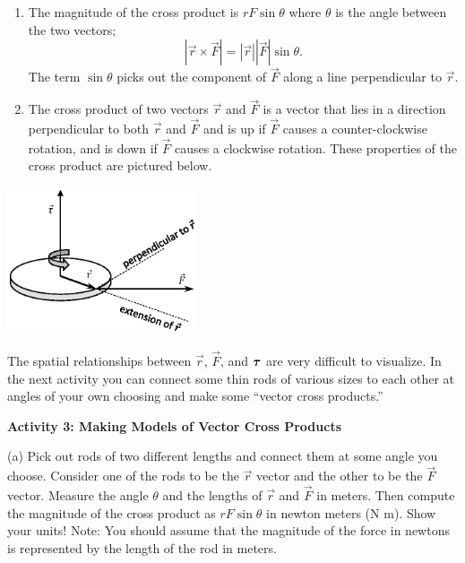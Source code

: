 \begin{enumerate}
\item The magnitude of the cross product is $rF\sin\theta$ where \( \theta  \)
is the angle between the two vectors; 
\[
\left| {\vec  r}\times {\vec  F}\right| =\left| {\vec  r}\right| \left| {\vec  F}\right| \sin \theta .\]
The term \( \sin \theta  \) picks out the component of \( {\vec  F} \)
along a line perpendicular to \( {\vec  r} \).
\item The cross product of two vectors \( {\vec  r} \) and \( {\vec  F} \)
is a vector that lies in a direction perpendicular to both \( {\vec  r} \)
and \( {\vec  F} \) and is up if \( {\vec  F} \) causes
a counter-clockwise rotation, and is down if \( {\vec  F} \) causes
a clockwise rotation. These properties of the cross product are pictured below.
\end{enumerate}
{\par\centering \includegraphics[height=1.7in]{ang_mom/ang_mom_fig3_new.eps} \par}

The spatial relationships between \( {\vec  r} \), \( {\vec  F} \),
and \( {\mbox{\boldmath$\tau$} } \) are very difficult to visualize. In the next
activity you can connect some thin rods of various sizes to each other at angles
of your own choosing and make some ``vector cross products.''

\textbf{Activity 3: Making Models of Vector Cross Products} 

(a) Pick out rods of two different lengths and connect them at some angle you
choose. Consider one of the rods to be the \( {\vec  r} \) vector
and the other to be the \( {\vec  F} \) vector. Measure the angle
\( \theta  \) and the lengths of \( {\vec  r} \) and \( {\vec  F} \)
in meters. Then compute the magnitude of the cross product as 
$rF\sin \theta $
in newton meters (N m). Show your units! Note: You should assume that the magnitude
of the force in newtons is represented by the length of the rod in meters.
\vspace{20mm}

